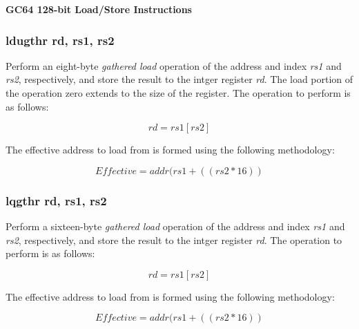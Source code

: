 \documentclass{article}
\begin{document}
\begin{center}
\textbf{GC64 128-bit Load/Store Instructions}
\makebox[0.03in][s]{}\makebox[0.03in][s]{}\makebox[0.03in][s]{}\makebox[0.03in][s]{}\makebox[0.03in][s]{}
\end{center}

\subsubsection{ldugthr rd, rs1, rs2}

Perform an eight-byte \emph{gathered load} operation of the address and
index \emph{rs1} and \emph{rs2}, respectively, and store the result
to the intger register \emph{rd}.  The load portion of the operation
zero extends to the size of the register.
The operation to perform is as follows:

\begin{equation}
rd = rs1[rs2]
\end{equation}

The effective address to load
from is formed using the following methodology:

\begin{equation}
Effective = addr(rs1 + ((rs2 * 16))
\end{equation}

\subsubsection{lqgthr rd, rs1, rs2}

Perform a sixteen-byte \emph{gathered load} operation of the address and
index \emph{rs1} and \emph{rs2}, respectively, and store the result
to the intger register \emph{rd}.
The operation to perform is as follows:

\begin{equation}
rd = rs1[rs2]
\end{equation}

The effective address to load
from is formed using the following methodology:

\begin{equation}
Effective = addr(rs1 + ((rs2 * 16))
\end{equation}
\end{document}
